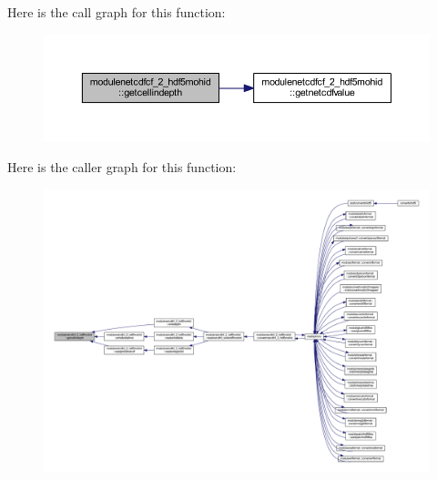 Here is the call graph for this function\+:\nopagebreak
\begin{figure}[H]
\begin{center}
\leavevmode
\includegraphics[width=350pt]{namespacemodulenetcdfcf__2__hdf5mohid_ac801b4c359021fc9e8880497aa5fc5d6_cgraph}
\end{center}
\end{figure}
Here is the caller graph for this function\+:\nopagebreak
\begin{figure}[H]
\begin{center}
\leavevmode
\includegraphics[width=350pt]{namespacemodulenetcdfcf__2__hdf5mohid_ac801b4c359021fc9e8880497aa5fc5d6_icgraph}
\end{center}
\end{figure}
\mbox{\label{namespacemodulenetcdfcf__2__hdf5mohid_a788802bec9e3806cfd877eb5bf6d2fef}} 
